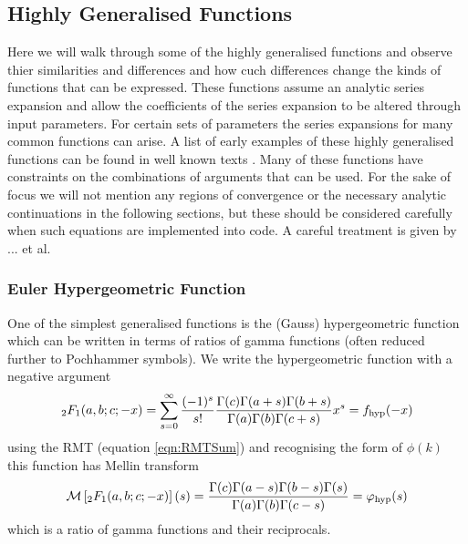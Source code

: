\documentclass[journal=jcisd8,manuscript=article,layout=onecolumn,pdftex,floatfix,amsmath,amssymb,10pt]{achemso}
\begin{document}
\subsection{Highly Generalised Functions}
Here we will walk through some of the highly generalised functions and observe thier similarities and differences and how cuch differences change the kinds of functions that can be expressed. These functions assume an analytic series expansion and allow the coefficients of the series expansion to be altered through input parameters. For certain sets of parameters the series expansions for many common functions can arise. A list of early examples of these highly generalised functions can be found in well known texts \cite{Erdelyi,Gradstein}. Many of these functions have constraints on the combinations of arguments that can be used. For the sake of focus we will not mention any regions of convergence or the necessary analytic continuations in the following sections, but these should be considered carefully when such equations are implemented into code. A careful treatment is given by ... et al. \cite{}

\subsubsection{Euler Hypergeometric Function}
One of the simplest generalised functions is the (Gauss) hypergeometric function which can be written in terms of ratios of gamma functions (often reduced further to Pochhammer symbols). We write the hypergeometric function with a negative argument
\begin{equation}
_2F_1(a,b;c;-x) = \sum_{s=0}^\infty \frac{(-1)^s}{s!} \frac{\Gamma(c)\Gamma(a+s)\Gamma(b+s)}{\Gamma(a)\Gamma(b)\Gamma(c+s)} x^s = f_{\rm hyp}(-x)
\label{eqn:hypergeom}
\end{equation}
using the RMT (equation \ref{eqn:RMTSum}) and recognising the form of $\phi(k)$ this function has Mellin transform
\begin{equation}
\mathcal{M}\left[_2F_1(a,b;c;-x)\right](s) = \frac{\Gamma(c)\Gamma(a-s)\Gamma(b-s)\Gamma(s)}{\Gamma(a)\Gamma(b)\Gamma(c-s)} = \varphi_{\rm hyp}(s)
\end{equation}
which is a ratio of gamma functions and their reciprocals.
\end{document}
